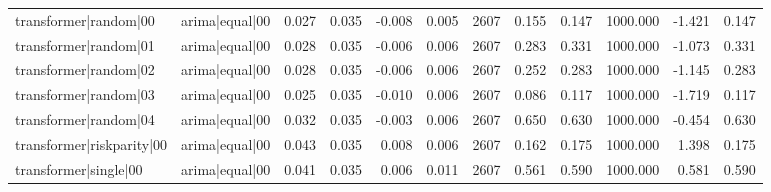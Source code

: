 \begin{table}
\begin{tabular}{llrrrrrrrrrr}
transformer|random|00 & arima|equal|00 & 0.027 & 0.035 & -0.008 & 0.005 & 2607 & 0.155 & 0.147 & 1000.000 & -1.421 & 0.147 \\
transformer|random|01 & arima|equal|00 & 0.028 & 0.035 & -0.006 & 0.006 & 2607 & 0.283 & 0.331 & 1000.000 & -1.073 & 0.331 \\
transformer|random|02 & arima|equal|00 & 0.028 & 0.035 & -0.006 & 0.006 & 2607 & 0.252 & 0.283 & 1000.000 & -1.145 & 0.283 \\
transformer|random|03 & arima|equal|00 & 0.025 & 0.035 & -0.010 & 0.006 & 2607 & 0.086 & 0.117 & 1000.000 & -1.719 & 0.117 \\
transformer|random|04 & arima|equal|00 & 0.032 & 0.035 & -0.003 & 0.006 & 2607 & 0.650 & 0.630 & 1000.000 & -0.454 & 0.630 \\
transformer|riskparity|00 & arima|equal|00 & 0.043 & 0.035 & 0.008 & 0.006 & 2607 & 0.162 & 0.175 & 1000.000 & 1.398 & 0.175 \\
transformer|single|00 & arima|equal|00 & 0.041 & 0.035 & 0.006 & 0.011 & 2607 & 0.561 & 0.590 & 1000.000 & 0.581 & 0.590 \\
\bottomrule
\end{tabular}
\end{table}
